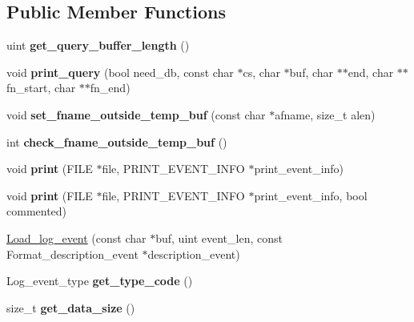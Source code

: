 \subsection*{Public Member Functions}
\begin{DoxyCompactItemize}
\item 
\mbox{\label{classLoad__log__event_ac0f183b6dbb21661d688c163528c6efc}} 
uint {\bfseries get\+\_\+query\+\_\+buffer\+\_\+length} ()
\item 
\mbox{\label{classLoad__log__event_aa6ee0a77ac1de542e3266a11752a970a}} 
void {\bfseries print\+\_\+query} (bool need\+\_\+db, const char $\ast$cs, char $\ast$buf, char $\ast$$\ast$end, char $\ast$$\ast$fn\+\_\+start, char $\ast$$\ast$fn\+\_\+end)
\item 
\mbox{\label{classLoad__log__event_a01fcfc6db442e6c8c165c64aca181d50}} 
void {\bfseries set\+\_\+fname\+\_\+outside\+\_\+temp\+\_\+buf} (const char $\ast$afname, size\+\_\+t alen)
\item 
\mbox{\label{classLoad__log__event_a10179f595e253152fbb8a3f00ecafe17}} 
int {\bfseries check\+\_\+fname\+\_\+outside\+\_\+temp\+\_\+buf} ()
\item 
\mbox{\label{classLoad__log__event_afd43d2808b1fcda5cd430e72aa432ac1}} 
void {\bfseries print} (F\+I\+LE $\ast$file, P\+R\+I\+N\+T\+\_\+\+E\+V\+E\+N\+T\+\_\+\+I\+N\+FO $\ast$print\+\_\+event\+\_\+info)
\item 
\mbox{\label{classLoad__log__event_af9ca6edb0ed660ad6162dc0dc5cbdd79}} 
void {\bfseries print} (F\+I\+LE $\ast$file, P\+R\+I\+N\+T\+\_\+\+E\+V\+E\+N\+T\+\_\+\+I\+N\+FO $\ast$print\+\_\+event\+\_\+info, bool commented)
\item 
\mbox{\hyperlink{classLoad__log__event_a04af106df96259276bce210ac13badfa}{Load\+\_\+log\+\_\+event}} (const char $\ast$buf, uint event\+\_\+len, const Format\+\_\+description\+\_\+event $\ast$description\+\_\+event)
\item 
\mbox{\label{classLoad__log__event_a74c486f5f481185f4ddd89421dbcd309}} 
Log\+\_\+event\+\_\+type {\bfseries get\+\_\+type\+\_\+code} ()
\item 
\mbox{\label{classLoad__log__event_aa4402269a84cce8814ae2996c7571620}} 
size\+\_\+t {\bfseries get\+\_\+data\+\_\+size} ()
\end{DoxyCompactItemize}

